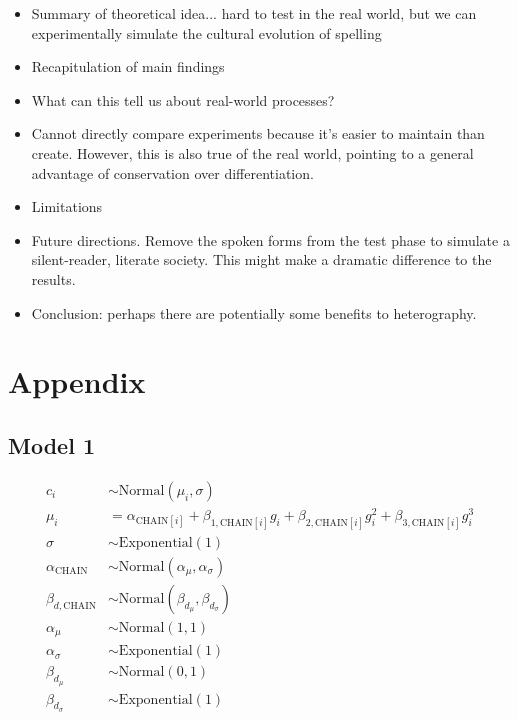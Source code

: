 \documentclass[doc,biblatex]{apa7}
\begin{document}
\begin{itemize}

	\item Summary of theoretical idea... hard to test in the real world, but we can experimentally simulate the cultural evolution of spelling

	\item Recapitulation of main findings

	\item What can this tell us about real-world processes?

	\item Cannot directly compare experiments because it's easier to maintain than create. However, this is also true of the real world, pointing to a general advantage of conservation over differentiation.

	\item Limitations

	\item Future directions. Remove the spoken forms from the test phase to simulate a silent-reader, literate society. This might make a dramatic difference to the results.

	\item Conclusion: perhaps there are potentially some benefits to heterography.

\end{itemize}

\section{Appendix}

\subsection{Model 1}

	\begin{align*}
	   c_i                   & \sim \mathrm{Normal}(\mu_i, \sigma) \\
	 \mu_i                   & = \alpha_{\mathrm{CHAIN}[i]} + \beta_{1,\mathrm{CHAIN}[i]} g_i + \beta_{2,\mathrm{CHAIN}[i]} g_i^2 + \beta_{3,\mathrm{CHAIN}[i]} g_i^3 \\
	\sigma                   & \sim \mathrm{Exponential}(1) \\
	\alpha_{\mathrm{CHAIN}}  & \sim \mathrm{Normal}(\alpha_\mu, \alpha_\sigma) \\
	\beta_{d,\mathrm{CHAIN}} & \sim \mathrm{Normal}(\beta_{d_\mu}, \beta_{d_\sigma}) \\
	\alpha_\mu               & \sim \mathrm{Normal}(1, 1) \\
	\alpha_\sigma            & \sim \mathrm{Exponential}(1) \\
	\beta_{d_\mu}            & \sim \mathrm{Normal}(0, 1) \\
	\beta_{d_\sigma}         & \sim \mathrm{Exponential}(1)
	\end{align*}
\end{document}
